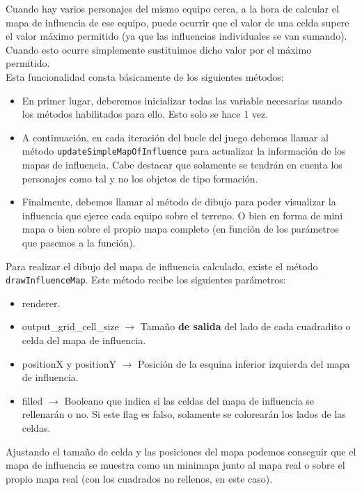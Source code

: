 Cuando hay varios personajes del mismo equipo cerca, a la hora de calcular el mapa de influencia de ese equipo, puede ocurrir que el valor de una celda supere el valor máximo permitido (ya que las influencias individuales se van sumando). Cuando esto ocurre simplemente sustituimos dicho valor por el máximo permitido. \\ 

Esta funcionalidad consta básicamente de los siguientes métodos:
\begin{itemize}
	\item En primer lugar, deberemos inicializar todas las variable necesarias usando los métodos habilitados para ello. Esto solo se hace 1 vez.
	\item A continuación, en cada iteración del bucle del juego debemos llamar al método \texttt{updateSimpleMapOfInfluence} para actualizar la información de los mapas de influencia. Cabe destacar que solamente se tendrán en cuenta los personajes como tal y no los objetos de tipo formación.
	\item Finalmente, debemos llamar al método de dibujo para poder visualizar la influencia que ejerce cada equipo sobre el terreno. O bien en forma de mini mapa o bien sobre el propio mapa completo (en función de los parámetros que pasemos a la función).	
\end{itemize}

Para realizar el dibujo del mapa de influencia calculado, existe el método \texttt{drawInfluenceMap}. Este método recibe los siguientes parámetros:
\begin{itemize}
	\item renderer.
	\item output\_grid\_cell\_size $\rightarrow$ Tamaño \textbf{de salida} del lado de cada cuadradito o celda del mapa de influencia.
	\item positionX y positionY $\rightarrow$ Posición de la esquina inferior izquierda del mapa de influencia.
	\item filled $\rightarrow$ Booleano que indica si las celdas del mapa de influencia se rellenarán o no. Si este flag es falso, solamente se colorearán los lados de las celdas.
\end{itemize}

Ajustando el tamaño de celda y las posiciones del mapa podemos conseguir que el mapa de influencia se muestra como un minimapa junto al mapa real o sobre el propio mapa real (con los cuadrados no rellenos, en este caso). \\

